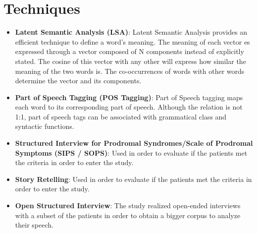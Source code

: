\documentclass{Paper_Summary}
\begin{document}
\section{Techniques}
    \begin{itemize}
        \item \textbf{Latent Semantic Analysis (LSA)}: Latent Semantic Analysis provides an efficient technique to define a word's meaning. The meaning of each vector es expressed through a vector composed of N components instead of explicitly stated. The cosine of this vector with any other will express how similar the meaning of the two words is. The co-occurrences of words with other words determine the vector and its components.
        \item \textbf{Part of Speech Tagging (POS Tagging)}: Part of Speech tagging maps each word to its corresponding part of speech. Although the relation is not 1:1, part of speech tags can be associated with grammatical class and syntactic functions.
        \item \textbf{Structured Interview for Prodromal Syndromes/Scale of Prodromal Symptoms (SIPS / SOPS)}: Used in order to evaluate if the patients met the criteria in order to enter the study.
        \item \textbf{Story Retelling}: Used in order to evaluate if the patients met the criteria in order to enter the study.
        \item \textbf{Open Structured Interview}: The study realized open-ended interviews with a subset of the patients in order to obtain a bigger corpus to analyze their speech.
    \end{itemize}
\end{document}
